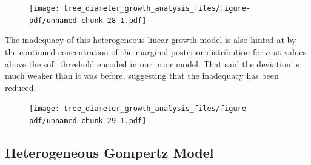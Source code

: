 \documentclass[
  letterpaper,
  DIV=11,
  numbers=noendperiod]{scrartcl}
\newenvironment{Shaded}{\begin{snugshade}}{\end{snugshade}}
\newcommand{\AttributeTok}[1]{\textcolor[rgb]{0.40,0.45,0.13}{#1}}
\newcommand{\DecValTok}[1]{\textcolor[rgb]{0.68,0.00,0.00}{#1}}
\newcommand{\FloatTok}[1]{\textcolor[rgb]{0.68,0.00,0.00}{#1}}
\newcommand{\FunctionTok}[1]{\textcolor[rgb]{0.28,0.35,0.67}{#1}}
\newcommand{\NormalTok}[1]{\textcolor[rgb]{0.00,0.23,0.31}{#1}}
\newcommand{\OtherTok}[1]{\textcolor[rgb]{0.00,0.23,0.31}{#1}}
\newcommand{\SpecialCharTok}[1]{\textcolor[rgb]{0.37,0.37,0.37}{#1}}
\newcommand{\StringTok}[1]{\textcolor[rgb]{0.13,0.47,0.30}{#1}}
\begin{document}
\begin{figure}[H]

{\centering \texttt{[image: tree\_diameter\_growth\_analysis\_files/figure-pdf/unnamed-chunk-28-1.pdf]}

}

\end{figure}

The inadequacy of this heterogeneous linear growth model is also hinted
at by the continued concentration of the marginal posterior distribution
for \(\sigma\) at values above the soft threshold encoded in our prior
model. That said the deviation is much weaker than it was before,
suggesting that the inadequacy has been reduced.

\begin{Shaded}
\end{Shaded}

\begin{figure}[H]

{\centering \texttt{[image: tree\_diameter\_growth\_analysis\_files/figure-pdf/unnamed-chunk-29-1.pdf]}

}

\end{figure}

\hypertarget{sec:gompertz}{%
\subsection{Heterogeneous Gompertz Model}\label{sec:gompertz}}
\end{document}
